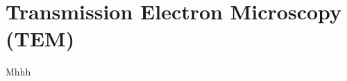 \documentclass[\main/dresen_thesis.tex]{subfiles}
\begin{document}
  \section{Transmission Electron Microscopy (TEM)}
    \label{ch:methods:tem}
    Mhhh
\end{document}
